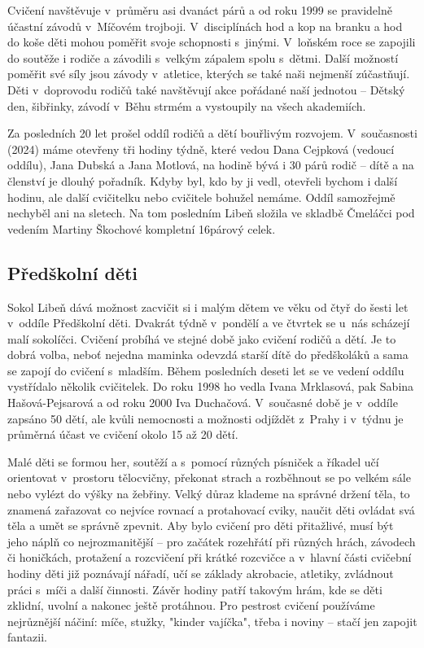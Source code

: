 \documentclass[a5paper, 11pt, twoside]{article}
\begin{document}
Cvičení navštěvuje v~průměru asi dvanáct párů a od roku 1999 se
pravidelně účastní závodů v~Míčovém trojboji. V~disciplínách hod a kop
na branku a hod do koše děti mohou poměřit svoje schopnosti s~jinými.
V~loňském roce se zapojili do soutěže i rodiče a závodili s~velkým zápalem
spolu s~dětmi. Další možností poměřit své síly jsou závody v~atletice,
kterých se také naši nejmenší zúčastňují. Děti v~doprovodu rodičů také
navštěvují akce pořádané naší jednotou -- Dětský den, šibřinky, závodí
v~Běhu strmém a vystoupily na všech akademiích.

Za posledních 20 let prošel oddíl rodičů a dětí bouřlivým rozvojem.
V~současnosti (2024) máme otevřeny tři hodiny týdně, které vedou Dana
Cejpková (vedoucí oddílu), Jana Dubská a Jana Motlová, na hodině bývá i
30 párů rodič -- dítě a na členství je dlouhý pořadník. Kdyby byl, kdo
by ji vedl, otevřeli bychom i další hodinu, ale další cvičitelku nebo
cvičitele bohužel nemáme. Oddíl samozřejmě nechyběl ani na sletech. Na
tom posledním Libeň složila ve skladbě Čmeláčci pod vedením Martiny
Škochové kompletní 16párový celek.

\subsection{Předškolní děti}

Sokol Libeň dává možnost zacvičit si i malým dětem ve věku od čtyř do
šesti let v~oddíle Předškolní děti. Dvakrát týdně v~pondělí a ve čtvrtek
se u~nás scházejí malí sokolíčci. Cvičení probíhá ve stejné době jako
cvičení rodičů a dětí. Je to dobrá volba, neboť nejedna maminka odevzdá
starší dítě do předškoláků a sama se zapojí do cvičení s~mladším. Během
posledních deseti let se ve vedení oddílu vystřídalo několik cvičitelek.
Do roku 1998 ho vedla Ivana Mrklasová, pak Sabina Hašová-Pejsarová a od
roku 2000 Iva Duchačová. V~současné době je v~oddíle zapsáno 50 dětí,
ale kvůli nemocnosti a možnosti odjíždět z~Prahy i v~týdnu je průměrná
účast ve cvičení okolo 15 až 20 dětí.

Malé děti se formou her, soutěží a s~pomocí různých písniček a říkadel
učí orientovat v~prostoru tělocvičny, překonat strach a rozběhnout se po
velkém sále nebo vylézt do výšky na žebřiny. Velký důraz klademe na
správné držení těla, to znamená zařazovat co nejvíce rovnací a
protahovací cviky, naučit děti ovládat svá těla a umět se správně
zpevnit. Aby bylo cvičení pro děti přitažlivé, musí být jeho náplň co
nejrozmanitější -- pro začátek rozehřátí při různých hrách, závodech či
honičkách, protažení a rozcvičení při krátké rozcvičce a v~hlavní části
cvičební hodiny děti již poznávají nářadí, učí se základy akrobacie,
atletiky, zvládnout práci s~míči a další činnosti. Závěr hodiny patří
takovým hrám, kde se děti zklidní, uvolní a nakonec ještě protáhnou. Pro
pestrost cvičení používáme nejrůznější náčiní: míče, stužky, "kinder
vajíčka", třeba i noviny -- stačí jen zapojit fantazii.
\end{document}
